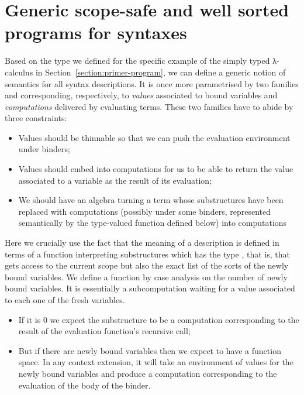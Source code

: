 

\section{Generic scope-safe and well sorted programs for syntaxes}\label{section:semantics}

Based on the \semrec{} type we defined for the specific example of the
simply typed λ-calculus in Section~\ref{section:primer-program},
we can define a generic notion of
semantics for all syntax descriptions. It is once more parametrised
by two  families  and  corresponding,
respectively, to \emph{values} associated to bound variables and
\emph{computations} delivered by evaluating terms. These two families
have to abide by three constraints:
\begin{itemize}
\item{} Values should be thinnable so that we can push the
      evaluation environment under binders;
\item{} Values should embed into computations for us to be able
      to return the value associated to a variable as the
      result of its evaluation;
\item{} We should have an algebra turning
      a term whose substructures have been replaced with
      computations (possibly under some binders, represented semantically
      by the  type-valued function defined below) into computations
\end{itemize}

\begin{center}
\end{center}

Here we crucially use the fact that the meaning of a description is
defined in terms of a function interpreting substructures which has
the type    , that is, that gets access
to the current scope but also the exact list of the sorts of the newly bound variables.
We define a function  by case analysis on the number of newly bound
variables. It is essentially a subcomputation waiting for a value associated to
each one of the fresh variables.
\begin{itemize}
\item If it is $0$ we expect the substructure to be a computation corresponding
    to the result of the evaluation function's recursive call;
  \item But if there are newly bound variables then we expect to have a function
    space. In any context extension, it will take an environment of values for
    the newly bound variables and produce a computation corresponding to the
    evaluation of the body of the binder.
\end{itemize}

